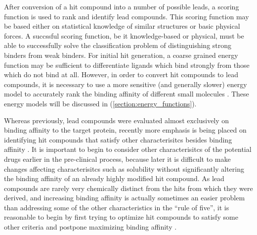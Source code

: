 After conversion of a hit compound into a number of possible leads, a scoring function is used to rank and identify lead compounds.
This scoring function may be based either on statistical knowledge of similar structures or basic physical forces.
A succssful scoring function, be it knowledge-based or physical, must be able to successfully solve the classification problem of distinguishing strong binders from weak binders.
For initial hit generation, a coarse grained energy function may be sufficient to differentiate ligands which bind strongly from those which do not bind at all.
However, in order to convert hit compounds to lead compounds, it is necessary to use a more sensitive (and generally slower) energy model to accurately rank the binding affinity of different small molecules \cite{jorgensen2004many,gohlke2002approaches}.
These energy models will be discussed in  (\ref{section:energy_functions}).

Whereas previously, lead compounds were evaluated almost exclusively on binding affinity to the target protein, recently more emphasis is being placed on identifying hit compounds that satisfy other characterisitcs besides binding affinity \cite{bleicher2003hit}.
It is important to begin to consider other characterisitcs of the potential drugs earlier in the pre-clinical process, because later it is difficult to make changes affecting characterisitcs such as solubility without significantly altering the binding affinity of an already highly modified hit compound.
As lead compounds are rarely very chemically distinct from the hits from which they were derived, and increasing binding affinity is actually sometimes an easier problem than addressing some of the other characteristics in the ``rule of five'', it is reasonable to begin by first trying to optimize hit compounds to satisfy some other criteria and postpone maximizing binding affinity \cite{proudfoot2002drugs}.
